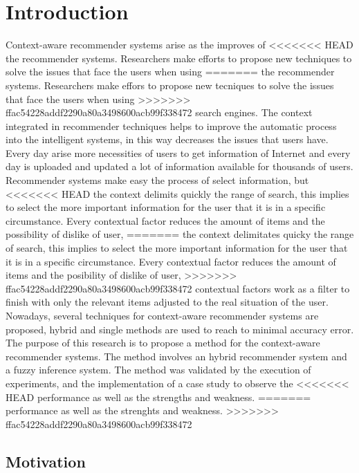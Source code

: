 \chapter{Introduction} \label{introduction} 

Context-aware recommender systems arise as the improves of 
<<<<<<< HEAD
the recommender systems. Researchers make efforts to propose 
new techniques to solve the issues that face the users when using 
=======
the recommender systems. Researchers make effors to propose 
new tecniques to solve the issues that face the users when using 
>>>>>>> ffac54228addf2290a80a3498600acb99f338472
search engines. The context integrated in recommender techniques 
helps to improve the automatic process into the intelligent systems, 
in this way decreases the issues that users have.
Every day arise more necessities of users to get information of  
Internet and every day  is uploaded and updated a lot of 
information available for thousands of users.
Recommender systems make easy the process of select information, but
<<<<<<< HEAD
the context delimits quickly the range of search, this implies
to select the more important information for the user that it is 
in a specific circumstance. Every contextual factor reduces the
amount of items and the possibility of dislike of user, 
=======
the context delimitates quicky the range of search, this implies
to select the more important information for the user that it is 
in a specific circumstance. Every contextual factor reduces the
amount of items and the posibility of dislike of user, 
>>>>>>> ffac54228addf2290a80a3498600acb99f338472
contextual factors work as a filter to finish with only 
the relevant items adjusted to the real situation of the user.
Nowadays, several techniques for context-aware recommender
systems are proposed, hybrid and single methods are used to
reach to minimal accuracy error. 
The purpose of this research is to propose a method for the
context-aware recommender systems. The method involves an 
hybrid recommender system and a fuzzy inference system. 
The method was validated by the execution of experiments, 
and the implementation of a case study to observe the 
<<<<<<< HEAD
performance as well as the strengths and weakness.
=======
performance as well as the strenghts and weakness.
>>>>>>> ffac54228addf2290a80a3498600acb99f338472

\section{Motivation}

